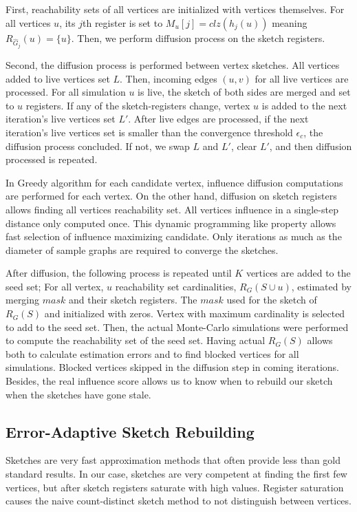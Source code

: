 \documentclass[10pt,journal,compsoc]{IEEEtran}
\begin{document}
First, reachability sets of all vertices are initialized with vertices themselves. For all vertices $u$, its $j$th register is set to $M_u[j]=clz(h_j(u))$ meaning $R_{\hat{G}_j}(u) = \{u\}$. Then, we perform diffusion process on the sketch registers. 

Second, the diffusion process is performed between vertex sketches. All vertices added to live vertices set $L$. Then, incoming edges $(u,v)$ for all live vertices are processed. For all simulation $u$ is live, the sketch of both sides are merged and set to $u$ registers. If any of the sketch-registers change, vertex $u$ is added to the next iteration's live vertices set $L'$. After live edges are processed, if the next iteration's live vertices set is smaller than the convergence threshold $\epsilon_c$, the diffusion process concluded. If not, we swap $L$ and $L'$, clear $L'$, and then diffusion processed is repeated. 

In Greedy algorithm\cite{kempe2003maximizing} for each candidate vertex, influence diffusion computations are performed for each vertex.  On the other hand, diffusion on sketch registers allows finding all vertices reachability set. All vertices influence in a single-step distance only computed once. This dynamic programming like property allows fast selection of influence maximizing candidate. Only iterations as much as the diameter of sample graphs are required to converge the sketches. 


After diffusion, the following process is repeated until $K$ vertices are added to the seed set; For all vertex, $u$ reachability set cardinalities, $R_G(S\cup u)$, estimated by merging $mask$ and their sketch registers. The $mask$ used for the sketch of $R_G(S)$ and initialized with zeros. Vertex with maximum cardinality is selected to add to the seed set. Then, the actual Monte-Carlo simulations were performed to compute the reachability set of the seed set. Having actual $R_G(S)$ allows both to calculate estimation errors and to find blocked vertices for all simulations. Blocked vertices skipped in the diffusion step in coming iterations. Besides, the real influence score allows us to know when to rebuild our sketch when the sketches have gone stale.

\subsection{Error-Adaptive Sketch Rebuilding}

Sketches are very fast approximation methods that often provide less than gold standard results. In our case, sketches are very competent at finding the first few vertices, but after sketch registers saturate with high values. Register saturation causes the naive count-distinct sketch method to not distinguish between vertices. 
\end{document}

